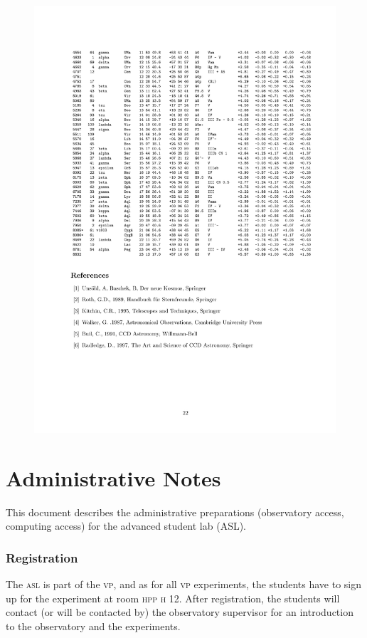 \documentclass[a4paper, 11pt, fleqn]{memoir}
\begin{document}
\begin{figure}
    \centering \includegraphics[width=14cm]{standardsterne_ubvri2} \caption*{} \label{}
\end{figure}

\chapter{Administrative Notes}

This document describes the administrative preparations (observatory access, computing access) for the advanced student lab (ASL).

\subsection{Registration}
The \textsc{asl} is part of the \textsc{vp}, and as for all \textsc{vp} experiments, the students have to sign up for the experiment at room \textsc{hpp} \textsc{h} 12.
After registration, the students will contact (or will be contacted by) the observatory supervisor for an introduction to the observatory and the experiments.
\end{document}
